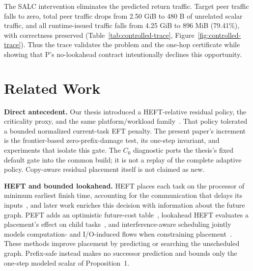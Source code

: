 \documentclass[sigconf]{acmart}
\begin{document}
The SALC intervention eliminates the predicted return traffic. Target peer traffic falls to zero, total peer traffic drops from 2.50 GiB to 480 B of unrelated scalar traffic, and all runtime-issued traffic falls from 4.25 GiB to 896 MiB (79.41\%), with correctness preserved (Table~\ref{tab:controlled-trace}, Figure~\ref{fig:controlled-trace}). Thus the trace validates the problem and the one-hop certificate while showing that P's no-lookahead contract intentionally declines this opportunity.

\section{Related Work}\label{sec:related-work}

\textbf{Direct antecedent.} Our thesis introduced a HEFT-relative residual policy, the criticality proxy, and the same platform/workload family~\citep{chengli2026multiobjective}. That policy tolerated a bounded normalized current-task EFT penalty. The present paper's increment is the frontier-based zero-prefix-damage test, its one-step invariant, and experiments that isolate this gate. The \(C_0\) diagnostic ports the thesis's fixed default gate into the common build; it is not a replay of the complete adaptive policy. Copy-aware residual placement itself is not claimed as new.

\textbf{HEFT and bounded lookahead.} HEFT places each task on the processor of minimum earliest finish time, accounting for the communication that delays its inputs~\citep{topcuoglu2002heft}, and later work enriches this decision with information about the future graph. PEFT adds an optimistic future-cost table~\citep{arabnejad2014peft}, lookahead HEFT evaluates a placement's effect on child tasks~\citep{bittencourt2010lookahead}, and interference-aware scheduling jointly models computation- and I/O-induced flows when constraining placement~\citep{bleuse2018anticipation}. These methods improve placement by predicting or searching the unscheduled graph. Prefix-safe instead makes no successor prediction and bounds only the one-step modeled scalar of Proposition~1.
\end{document}
